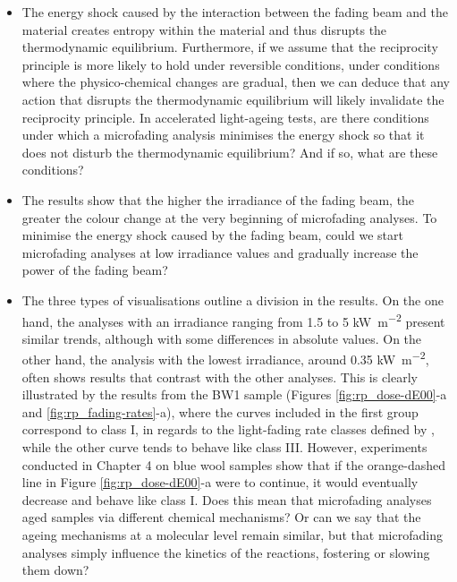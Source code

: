 \begin{itemize}
    \item The energy shock caused by the interaction between the fading beam and the material creates entropy within the material and thus disrupts the thermodynamic equilibrium. Furthermore, if we assume that the reciprocity principle is more likely to hold under reversible conditions, \ie under conditions where the physico-chemical changes are gradual, then we can deduce that any action that disrupts the thermodynamic equilibrium will likely invalidate the reciprocity principle. In accelerated light-ageing tests, are there conditions under which a microfading analysis minimises the energy shock so that it does not disturb the thermodynamic equilibrium? And if so, what are these conditions?
    \item The results show that the higher the irradiance of the fading beam, the greater the colour change at the very beginning of microfading analyses. To minimise the energy shock caused by the fading beam, could we start microfading analyses at low irradiance values and gradually increase the power of the fading beam? 
    \item The three types of visualisations outline a division in the results. On the one hand, the analyses with an irradiance ranging from 1.5 to 5 \unit{\kilo\watt\per\square\metre} present similar trends, although with some differences in absolute values. On the other hand, the analysis with the lowest irradiance, around 0.35 \unit{\kilo\watt\per\square\metre}, often shows results that contrast with the other analyses. This is clearly illustrated by the results from the BW1 sample (Figures \ref{fig:rp_dose-dE00}-a and \ref{fig:rp_fading-rates}-a), where the curves included in the first group correspond to class I, in regards to the light-fading rate classes defined by \citet{giles_observations_1968}, while the other curve tends to behave like class III. However, experiments conducted in Chapter 4 on blue wool samples show that if the orange-dashed line in Figure \ref{fig:rp_dose-dE00}-a were to continue, it would eventually decrease and behave like class I. Does this mean that microfading analyses aged samples via different chemical mechanisms? Or can we say that the ageing mechanisms at a molecular level remain similar, but that microfading analyses simply influence the kinetics of the reactions, fostering or slowing them down? 
\end{itemize}


